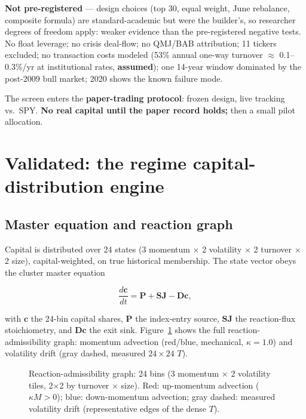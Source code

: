 \documentclass[11pt,a4paper]{article}
\begin{document}
\textbf{Not pre-registered} --- design choices (top 30, equal weight, June rebalance, composite formula) are standard-academic but were the builder's, so researcher degrees of freedom apply: weaker evidence than the pre-registered negative tests. No float leverage; no crisis deal-flow; no QMJ/BAB attribution; 11 tickers excluded; no transaction costs modeled (53\% annual one-way turnover $\approx$ 0.1--0.3\%/yr at institutional rates, \textbf{assumed}); one 14-year window dominated by the post-2009 bull market; 2020 shows the known failure mode.

The screen enters the \textbf{paper-trading protocol}: frozen design, live tracking vs.\ SPY. \textbf{No real capital until the paper record holds;} then a small pilot allocation.

\section{Validated: the regime capital-distribution engine}
\label{sec:engine}

\subsection{Master equation and reaction graph}

Capital is distributed over 24 states (3 momentum $\times$ 2 volatility $\times$ 2 turnover $\times$ 2 size), capital-weighted, on true historical membership. The state vector obeys the cluster master equation

\begin{equation}
\frac{d\mathbf{c}}{dt} = \mathbf{P} + \mathbf{S}\mathbf{J} - \mathbf{D}\mathbf{c},
\end{equation}

with $\mathbf{c}$ the 24-bin capital shares, $\mathbf{P}$ the index-entry source, $\mathbf{S}\mathbf{J}$ the reaction-flux stoichiometry, and $\mathbf{D}\mathbf{c}$ the exit sink. Figure~\ref{fig:rag} shows the full reaction-admissibility graph: momentum advection (red/blue, mechanical, $\kappa=1.0$) and volatility drift (gray dashed, measured $24\times24$ $T$).

\begin{figure}[t]
\centering
\resizebox{\textwidth}{!}{}
\caption{Reaction-admissibility graph: 24 bins (3 momentum $\times$ 2 volatility tiles, 2$\times$2 by turnover $\times$ size). Red: up-momentum advection ($\kappa M>0$); blue: down-momentum advection; gray dashed: measured volatility drift (representative edges of the dense $T$).}
\label{fig:rag}
\end{figure}
\end{document}
